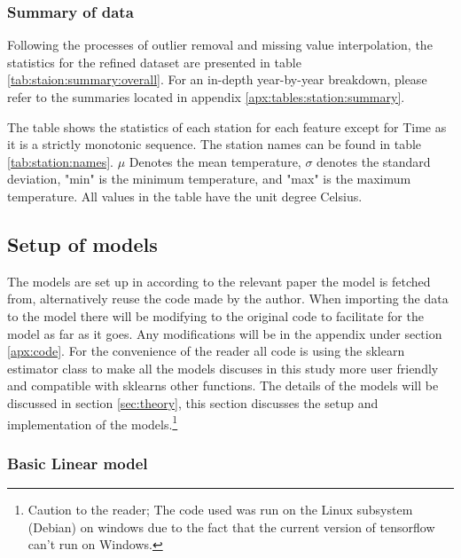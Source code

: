 \subsubsection{Summary of data}

Following the processes of outlier removal and missing value interpolation, the statistics for the refined dataset are presented in table \ref{tab:staion:summary:overall}. For an in-depth year-by-year breakdown, please refer to the summaries located in appendix \ref{apx:tables:station:summary}.

\begin{table}[H]
	\begin{adjustwidth}{-1in}{-1in}
		\centering
		
	\end{adjustwidth}
	\caption[Table of station statistics]{The table shows the statistics of each station for each feature except for Time as it is a strictly monotonic sequence. The station names can be found in table \ref{tab:station:names}. $\mu$ Denotes the mean temperature, $\sigma$ denotes the standard deviation, "min" is the minimum temperature, and "max" is the maximum temperature. All values in the table have the unit degree Celsius.}
	\label{tab:staion:summary:overall}
\end{table}

\subsection{Setup of models}

The models are set up in according to the relevant paper the model is fetched from, alternatively reuse the code made by the author. When importing the data to the model there will be modifying to the original code to facilitate for the model as far as it goes. Any modifications will be in the appendix under section \ref{apx:code}. For the convenience of the reader all code is using the sklearn estimator class to make all the models discuses in this study more user friendly and compatible with sklearns other functions. The details of the models will be discussed in section \ref{sec:theory}, this section discusses the setup and implementation of the models.\footnote{Caution to the reader; The code used was run on the Linux subsystem (Debian) on windows due to the fact that the current version of tensorflow can't run on Windows.}

\subsubsection{Basic Linear model}

